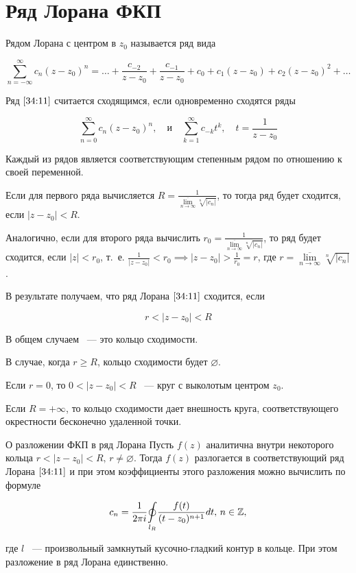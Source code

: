 \documentclass[../../main.tex]{subfiles}
\begin{document}
\section{Ряд Лорана ФКП}

Рядом Лорана с центром в $ z_0 $ называется ряд вида

\begin{equation}\label{34:11}
	\sum\limits_{n = -\infty}^{\infty}c_n(z - z_0)^n = \ldots + \frac{c_{-2}}{z - 
	z_0} + \frac{c_{-1}}{z - z_0} + c_0 + c_1(z - z_0) + c_2(z - z_0)^2 + \ldots
\end{equation}

Ряд $ \eqref{34:11} $ считается сходящимся, если одновременно сходятся ряды 

\[ \sum\limits_{n = 0}^{\infty} c_n(z - z_0)^n, \quad \text{и} \quad 
\sum\limits_{k = 1}^{\infty} c_{-k}t^k, \quad t = \frac{1}{z - z_0} \]

Каждый из рядов является соответствующим степенным рядом по отношению к своей 
переменной.

Если для первого ряда вычисляется $ R = \frac{1}{\overline{\underset{n \to 
\infty}{\lim}} \sqrt[n]{|c_n|}} $, то тогда ряд будет сходится, если $ |z - 
z_0| < R $.

Аналогично, если для второго ряда вычислить $ r_0 = 
\frac{1}{\overline{\underset{n \to \infty}{\lim}} \sqrt[n]{|c_n|}} $, то ряд 
будет сходится, если $ |z| < r_0 $, т.~е. $ \frac{1}{|z - z_0|} < r_0 \implies 
|z - z_0| > \frac{1}{r_0} = r $, где $ r = \overline{\underset{n \to 
\infty}{\lim}} \sqrt[n]{|c_n|} $.

В результате получаем, что ряд Лорана $ \eqref{34:11} $ сходится, если

\[ r < |z - z_0| < R \]

В общем случаем ~--- это кольцо сходимости.

В случае, когда $ r \geq R $, кольцо сходимости будет $ \varnothing $.

Если $r = 0$, то $ 0 < |z - z_0| < R $ ~--- круг с выколотым центром $z_0$.

Если $ R = +\infty $, то кольцо сходимости дает внешность круга, 
соответствующего окрестности бесконечно удаленной точки.

\begin{thm}{О разложении ФКП в ряд Лорана}
	Пусть $ f(z) $ аналитична внутри некоторого кольца $ r < |z - z_0| < R,\, r 
	\neq \varnothing $. Тогда $ f(z) $ разлогается в соответствующий ряд Лорана $ 
	\eqref{34:11} $ и при этом коэффициенты этого разложения можно вычислить по 
	формуле
	
	\begin{equation}\label{34:12}
		c_n = \frac{1}{2 \pi i} \underset{l_R}\oint\frac{f(t)}{(t - z_0)^{n + 1}} 
		dt,\, n \in \mathbb{Z},
	\end{equation}
	
	где $ l $ ~--- произвольный замкнутый кусочно-гладкий контур в кольце. При 
	этом разложение в ряд Лорана единственно.
\end{thm}
\end{document}
